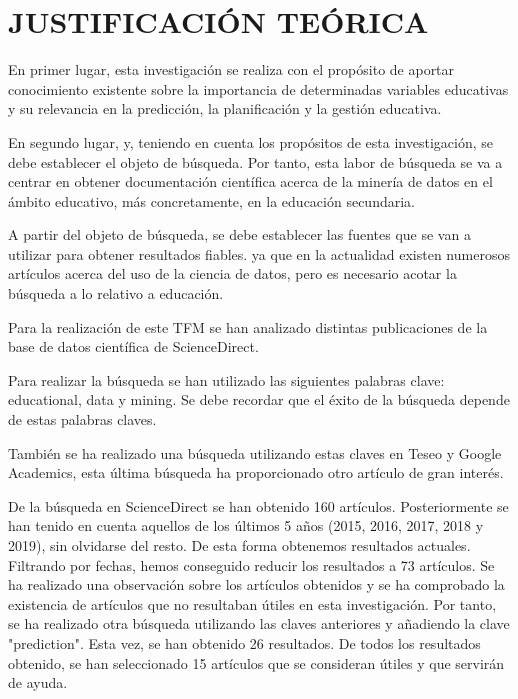 \section{JUSTIFICACIÓN TEÓRICA}
En primer lugar, esta investigación se realiza con el propósito de aportar conocimiento existente sobre la importancia de determinadas variables educativas y su relevancia en la predicción, la planificación y la gestión educativa. 

En segundo lugar, y, teniendo en cuenta los propósitos de esta investigación, se debe establecer el objeto de búsqueda. Por tanto, esta labor de búsqueda se va a centrar en obtener documentación científica acerca de la minería de datos en el ámbito educativo, más concretamente, en la educación secundaria. 

A partir del objeto de búsqueda, se debe establecer las fuentes que se van a utilizar para obtener resultados fiables. ya que en la actualidad existen numerosos artículos acerca del uso de la ciencia de datos, pero es necesario acotar la búsqueda a lo relativo a educación.

Para la realización de este TFM se han analizado distintas publicaciones de la base de datos científica de ScienceDirect. 

Para realizar la búsqueda se han utilizado las siguientes palabras clave: educational, data y mining. Se debe recordar que el éxito de la búsqueda depende de estas palabras claves.

También se ha realizado una búsqueda utilizando estas claves en Teseo y Google Academics, esta última búsqueda ha proporcionado otro artículo de gran interés.

De la búsqueda en ScienceDirect se han obtenido 160 artículos. Posteriormente se han tenido en cuenta aquellos de los últimos 5 años (2015, 2016, 2017, 2018 y 2019), sin olvidarse del resto. De esta forma obtenemos resultados actuales. Filtrando por fechas, hemos conseguido reducir los resultados a 73 artículos. Se ha realizado una observación sobre los artículos obtenidos y se ha comprobado la existencia de artículos que no resultaban útiles en esta investigación. Por tanto, se ha realizado otra búsqueda utilizando las claves anteriores y añadiendo la clave "prediction". Esta vez, se han obtenido 26 resultados. De todos los resultados obtenido, se han seleccionado 15 artículos que se consideran útiles y que servirán de ayuda.

